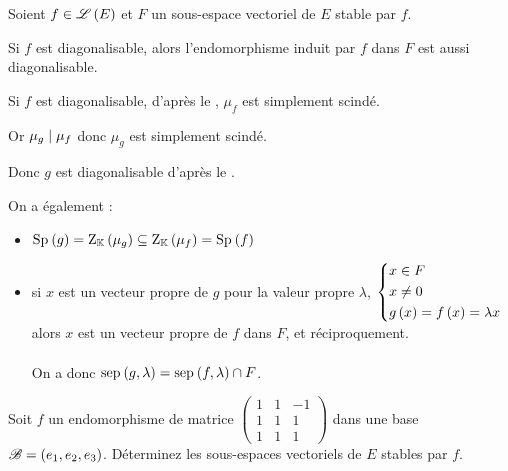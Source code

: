 \begin{cor}
Soient \(f\in\mathscr{L}\left(E\right)\) et \(F\) un sous-espace vectoriel de \(E\) stable par \(f\).

Si \(f\) est diagonalisable, alors l'endomorphisme induit par \(f\) dans \(F\) est aussi diagonalisable.
\end{cor}

\begin{dem}
Si \(f\) est diagonalisable, d'après le , \(\mu_f\) est simplement scindé.

Or \(\mu_g\mid\mu_f\) donc \(\mu_g\) est simplement scindé.

Donc \(g\) est diagonalisable d'après le .
\end{dem}

\begin{rem}
On a également :

\begin{itemize}
    \item \(\Sp{g}=\rac{\mu_g}\subset\rac{\mu_f}=\Sp{f}\) \\
    \item si \(x\) est un vecteur propre de \(g\) pour la valeur propre \(\lambda\), \ie \(\begin{dcases}
        x\in F \\
        x\not=0 \\
        g\left(x\right)=f\left(x\right)=\lambda x
    \end{dcases}\) alors \(x\) est un vecteur propre de \(f\) dans \(F\), et réciproquement. \\\\ On a donc \(\sep{g}{\lambda}=\sep{f}{\lambda}\inter F\).
\end{itemize}
\end{rem}

\begin{exo}
Soit \(f\) un endomorphisme de matrice \(\begin{pmatrix}
1 & 1 & -1 \\
1 & 1 & 1 \\
1 & 1 & 1
\end{pmatrix}\) dans une base \(\mathscr{B}=\left(e_1,e_2,e_3\right)\). Déterminez les sous-espaces vectoriels de \(E\) stables par \(f\).
\end{exo}

